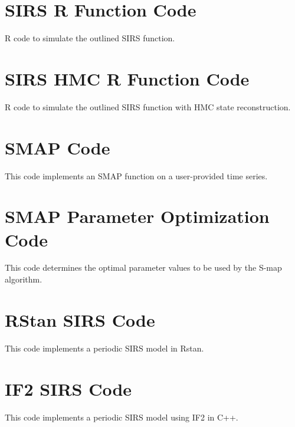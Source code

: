 
\section{SIRS R Function Code}

	R code to simulate the outlined SIRS function.

	

\section{SIRS HMC R Function Code}

	R code to simulate the outlined SIRS function with HMC state reconstruction.

	

\section{SMAP Code}

	This code implements an SMAP function on a user-provided time series.

	

\section{SMAP Parameter Optimization Code}

	This code determines the optimal parameter values to be used by the S-map algorithm.

	

\section{RStan SIRS Code}

    This code implements a periodic SIRS model in Rstan.

    

\section{IF2 SIRS Code}

    This code implements a periodic SIRS model using IF2 in C++.

    